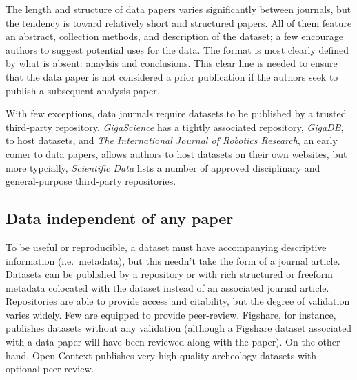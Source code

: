 \documentclass[10pt,a4paper,twocolumn]{article}
\begin{document}
The length and structure of data papers varies significantly between journals, but the tendency is toward relatively short and structured papers.
All of them feature an abstract, collection methods, and description of the dataset; a few \cite{ubiquity_press_metajournals} encourage authors to suggest potential uses for the data.
The format is most clearly defined by what is absent: anaylsis and conclusions.
This clear line is needed to ensure that the data paper is not considered a prior publication if the authors seek to publish a subsequent analysis paper.

With few exceptions, data journals require datasets to be published by a trusted third-party repository. 
\emph{GigaScience} has a tightly associated repository, \emph{GigaDB}, to host datasets, and \emph{The International Journal of Robotics Research}\cite{international_journal_of_robotics_research}, an early comer to data papers, allows authors to host datasets on their own websites, but more typcially, \emph{Scientific Data} lists a number of approved disciplinary and general-purpose third-party repositories.




\subsection*{Data independent of any paper}\label{paper-independent-data}

To be useful or reproducible, a dataset must have accompanying descriptive information (i.e.~metadata), but this needn't take the form of a journal article. 
Datasets can be published by a repository or with rich structured or freeform metadata colocated with the dataset instead of an associated journal article. Repositories are able to provide access and citability, but the degree of validation varies widely. 
Few are equipped to provide peer-review. Figshare\cite{figshare}, for instance, publishes datasets without any validation (although a Figshare dataset associated with a data paper will have been reviewed along with the paper). 
On the other hand, Open Context\cite{open_context} publishes very high quality archeology datasets with optional peer review.
\end{document}
